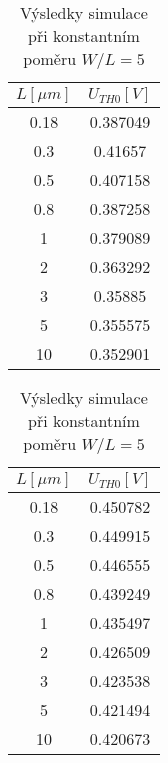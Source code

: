 \begin{table}[H]
    \begin{minipage}{0.5\textwidth}
        \centering
        \begin{tabular}{|c|c|}
            \hline
            \(L [\mu m]\) & \(U_{TH0} [V]\) \\ \hline
            0.18          & 0.387049	    \\ \hline
            0.3	          & 0.41657	        \\ \hline
            0.5	          & 0.407158	    \\ \hline
            0.8	          & 0.387258	    \\ \hline
            1	          & 0.379089	    \\ \hline
            2	          & 0.363292	    \\ \hline
            3	          & 0.35885	        \\ \hline
            5	          & 0.355575	    \\ \hline
            10	          & 0.352901	    \\ \hline
        \end{tabular}

        \vspace{5mm}
    \end{minipage}
    \hfill
    \begin{minipage}{0.5\textwidth}
        \centering
        \begin{tabular}{|c|c|}
            \hline
            \(L [\mu m]\) & \(U_{TH0} [V]\) \\ \hline
            0.18          & 0.450782	 \\ \hline
            0.3	          & 0.449915	 \\ \hline
            0.5	          & 0.446555	 \\ \hline
            0.8	          & 0.439249	 \\ \hline
            1	          & 0.435497	 \\ \hline
            2	          & 0.426509	 \\ \hline
            3	          & 0.423538	 \\ \hline
            5	          & 0.421494	 \\ \hline
            10	          & 0.420673	 \\ \hline
        \end{tabular}

        \vspace{5mm}
    \end{minipage}

    \caption{\label{tab:N_wl_const} Výsledky simulace při konstantním poměru \(W/L = 5\)}
\end{table}